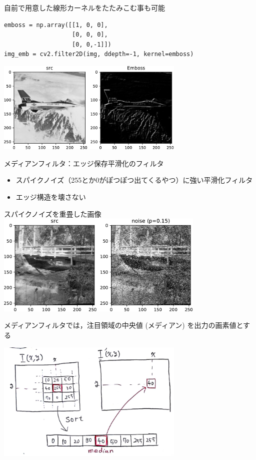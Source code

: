 \documentclass[10pt]{beamer}
\begin{document}
	\begin{frame}[fragile]{自前で用意した線形カーネルをたたみこむ事も可能}
	    \begin{verbatim}
emboss = np.array([[1, 0, 0], 
                   [0, 0, 0], 
                   [0, 0,-1]])
img_emb = cv2.filter2D(img, ddepth=-1, kernel=emboss)
	    \end{verbatim}
	    \begin{center}
    		\includegraphics[width=9cm]{./figs/emboss.pdf}
		\end{center}
	\end{frame}
	
	\begin{frame}{メディアンフィルタ：エッジ保存平滑化のフィルタ}
	    \begin{itemize}
	        \item スパイクノイズ（255とか0がぽつぽつ出てくるやつ）に強い平滑化フィルタ
	        \item エッジ構造を壊さない
	    \end{itemize}
	    \begin{center}
	        スパイクノイズを重畳した画像
	        \includegraphics[width=10.0cm]{figs/spike.pdf}
	    \end{center}
	\end{frame}
	
	\begin{frame}{メディアンフィルタでは，注目領域の中央値 (メディアン) を出力の画素値とする}
	    \begin{center}
	        \includegraphics[width=9.0cm]{figs/median_filter.png}
	    \end{center}
	\end{frame}
	
\end{document}
